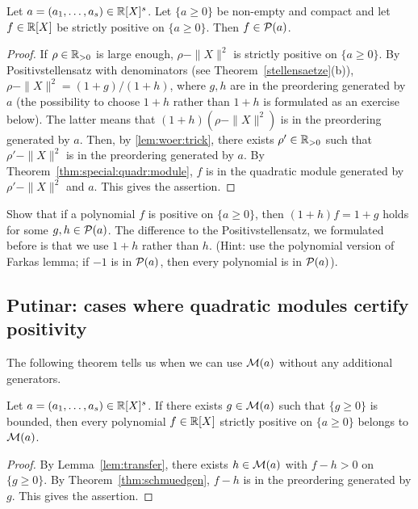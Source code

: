 \begin{theorem}
	\label{thm:schmuedgen}
	Let $a=(a_1,\ldots,a_s) \in \mathbb{R}[X]^s$. Let $\{a \ge 0\}$ be non-empty and compact and let $f \in \mathbb{R}[X]$ be strictly positive on $\{a \ge 0\}$. Then $f \in \mathcal{P}(a)$. 
\end{theorem}
\begin{proof}
	If $\rho \in \mathbb{R}_{>0}$ is large enough, $\rho - \|X\|^2$ is strictly positive on $\{a \ge 0\}$. By Positivstellensatz with denominators (see Theorem~\ref{stellensaetze}(b)), $\rho -\|X\|^2 = (1+g)/(1+h)$, where $g, h$ are in the preordering generated by $a$ (the possibility to choose $1+h$ rather than $1+h$ is formulated as an exercise below). The latter means that $(1+h) (\rho - \|X\|^2)$ is in the preordering generated by $a$. Then, by \eqref{lem:woer:trick}, there exists $\rho' \in \mathbb{R}_{>0}$ such that $\rho' - \|X\|^2$ is in the preordering generated by $a$. By Theorem~\ref{thm:special:quadr:module}, $f$ is in the quadratic module generated by $\rho' - \|X\|^2$ and $a$. This gives the assertion.
\end{proof}

\begin{exercise}
	Show that if a polynomial $f$ is positive on $\{a \ge 0\}$, then $(1+h) f = 1+g$ holds for some $g,h \in \mathcal{P}(a)$. The difference to the Positivstellensatz, we formulated before is that we use $1+h$ rather than $h$. (Hint: use the polynomial version of Farkas lemma; if $-1$ is in $\mathcal{P}(a)$, then every polynomial is in $\mathcal{P}(a)$). 
\end{exercise} 

\subsection{Putinar: cases where quadratic modules certify positivity}

The following theorem tells us when we can use $\mathcal{M}(a)$ without any additional generators. 

\begin{theorem}[Putinar]
	Let $a=(a_1,\ldots,a_s) \in \mathbb{R}[X]^s$. If there exists $g \in \mathcal{M}(a)$ such that $\{g \ge 0\}$ is bounded, then every polynomial $f \in \mathbb{R}[X]$ strictly positive on $\{a \ge 0\}$ belongs to $\mathcal{M}(a)$. 
\end{theorem}
\begin{proof}
	By Lemma~\ref{lem:transfer}, there exists $h \in \mathcal{M}(a)$ with $f - h > 0$ on $\{g \ge 0\}$. By Theorem~\ref{thm:schmuedgen}, $f - h$ is in the preordering generated by $g$. This gives the assertion. 
\end{proof}

